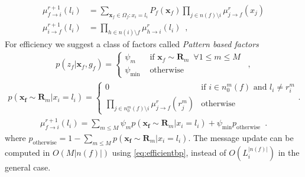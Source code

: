 \documentclass[final]{beamer}
\newcommand{\vect}[1]{\mathbf{#1}}
\newcommand{\map}{\vect{x}}
\newcommand{\bpmsg}[4]{\mu^{#4}_{#1\rightarrow#2}(#3)}
\begin{document}
\begin{multicols}{3}
\begin{align}
  \bpmsg{f}{i}{l_i}{r+1} &= \sum_{\map_f \in \Omega_f: x_i = l_i}P_f(\map_f)\prod_{j \in n(f) \setminus i}\bpmsg{j}{f}{x_j}{r}
  \label{eq:factor2node}
  \\
  \bpmsg{i}{f}{l_i}{r+1} &= \prod_{h \in n(i) \setminus f}\bpmsg{h}{i}{l_i}{r}
  \enspace,
  \label{eq:node2factor}
\end{align}
    For efficiency we suggest a class of factors called
    \textit{Pattern based factors} 
    \begin{align}
      p(z_f|\map_f, g_f) = \begin{cases}
        \psi_{m} & \text{ if $\map_f \sim \vect{R}_m$} \,\,\, \forall 1 \le m \le M\\
        \psi_{\text{min}} & \text{ otherwise}
      \end{cases}
      \enspace,
      \label{eq:patternfunction}
    \end{align}
    \begin{align}
      p(\vect{x_f} \sim \vect{R}_m|x_i = l_i)
      = \begin{cases}
    0 & \text{if $i \in n^m_0(f)$ and $l_i \ne r^m_i$}\\
      \prod\limits_{j \in n^m_0(f) \setminus i}\bpmsg{j}{f}{r^m_j}{r} & \text{otherwise}
      \end{cases}.
    \end{align}
    \begin{align}
      \bpmsg{f}{i}{l_i}{r+1} =
      \sum_{m \le M} \psi_m p(\vect{x_f} \sim \vect{R}_m|x_i = l_i)
      + \psi_{\text{min}} p_{\text{otherwise}}
      \label{eq:efficientbp}
      \enspace.
    \end{align}
    where $p_{\text{otherwise}} = 1 - \sum_{m \le M}p(\vect{x_f} \sim \vect{R}_m|x_i = l_i)$.  The message update can be computed in $O(M|n(f)|)$ using
    \eqref{eq:efficientbp}, instead of $O(L_i^{|n(f)|})$ in the general case.




\end{multicols}
\end{document}
